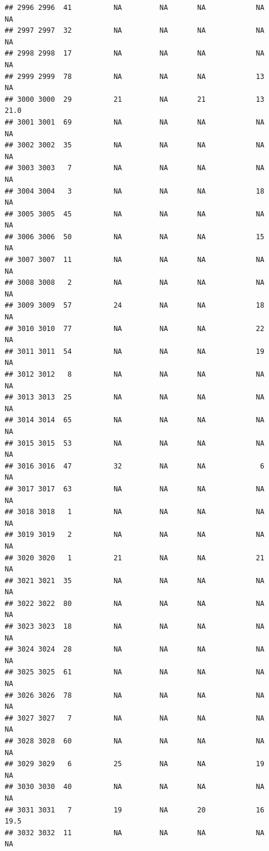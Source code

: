 \documentclass[man]{apa6}
\begin{document}
\begin{verbatim}
## 2996 2996  41          NA         NA       NA            NA       NA
## 2997 2997  32          NA         NA       NA            NA       NA
## 2998 2998  17          NA         NA       NA            NA       NA
## 2999 2999  78          NA         NA       NA            13       NA
## 3000 3000  29          21         NA       21            13     21.0
## 3001 3001  69          NA         NA       NA            NA       NA
## 3002 3002  35          NA         NA       NA            NA       NA
## 3003 3003   7          NA         NA       NA            NA       NA
## 3004 3004   3          NA         NA       NA            18       NA
## 3005 3005  45          NA         NA       NA            NA       NA
## 3006 3006  50          NA         NA       NA            15       NA
## 3007 3007  11          NA         NA       NA            NA       NA
## 3008 3008   2          NA         NA       NA            NA       NA
## 3009 3009  57          24         NA       NA            18       NA
## 3010 3010  77          NA         NA       NA            22       NA
## 3011 3011  54          NA         NA       NA            19       NA
## 3012 3012   8          NA         NA       NA            NA       NA
## 3013 3013  25          NA         NA       NA            NA       NA
## 3014 3014  65          NA         NA       NA            NA       NA
## 3015 3015  53          NA         NA       NA            NA       NA
## 3016 3016  47          32         NA       NA             6       NA
## 3017 3017  63          NA         NA       NA            NA       NA
## 3018 3018   1          NA         NA       NA            NA       NA
## 3019 3019   2          NA         NA       NA            NA       NA
## 3020 3020   1          21         NA       NA            21       NA
## 3021 3021  35          NA         NA       NA            NA       NA
## 3022 3022  80          NA         NA       NA            NA       NA
## 3023 3023  18          NA         NA       NA            NA       NA
## 3024 3024  28          NA         NA       NA            NA       NA
## 3025 3025  61          NA         NA       NA            NA       NA
## 3026 3026  78          NA         NA       NA            NA       NA
## 3027 3027   7          NA         NA       NA            NA       NA
## 3028 3028  60          NA         NA       NA            NA       NA
## 3029 3029   6          25         NA       NA            19       NA
## 3030 3030  40          NA         NA       NA            NA       NA
## 3031 3031   7          19         NA       20            16     19.5
## 3032 3032  11          NA         NA       NA            NA       NA

\end{verbatim}
\end{document}
